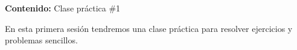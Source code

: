 {\large\textbf{Contenido:} Clase práctica \#1}

En esta primera sesión tendremos una clase práctica para resolver ejercicios y problemas sencillos.